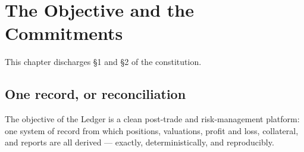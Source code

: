 
\begin{abstract}
Reconciliation exists because many systems store the same facts, and independently
maintained copies eventually disagree. The Ledger removes the cause: every fact is
recorded exactly once, in an immutable log of atomic transactions, and every other
number --- balances, valuations, profit and loss, reports --- is a deterministic
projection of that single record, reproducible by any party and reconstructible at any
past date. This specification defines the system in full, rated one-way against the
Ledger Framework Constitution v1.1: the objects the system manipulates and the signed
coordinate vector every balance generalises to; the three machines that evaluate the
pipeline --- the Event Monitor, the Events Executor, and the Transaction Executor,
three roles and one writer; smart contracts as pure, stateless transcriptions of legal
terms; the three homes of state; valuation and profit and loss; ingestion, corporate
actions, and the market data operator; collateral, margin, and lending under the
declared legal regime of the governing agreement; virtual ledgers and the total return
swap; the settlement interface; presentation and reporting projections; alignment with
the Common Domain Model; and the invariant catalogue and executable-check regime that
make every guarantee a property a machine can run. Six instruments with fixed terms
and fixed quantities recur through every chapter, so that each claim is exercised on
the same worked facts it governs.
\end{abstract}

\tableofcontents
\clearpage

\section{The Objective and the Commitments}\label{ch:objective}

This chapter discharges \S1 and \S2 of the constitution.

\subsection{One record, or reconciliation}

The objective of the Ledger is a clean post-trade and risk-management platform: one
system of record from which positions, valuations, profit and loss, collateral, and
reports are all derived --- exactly, deterministically, and reproducibly.

